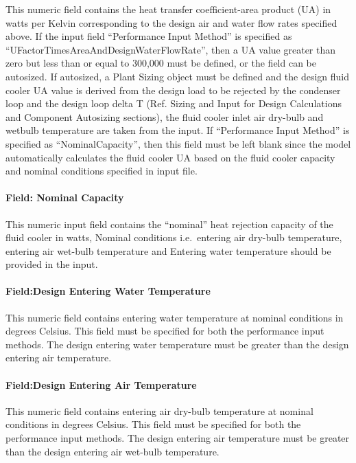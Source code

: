 This numeric field contains the heat transfer coefficient-area product (UA) in watts per Kelvin corresponding to the design air and water flow rates specified above. If the input field ``Performance Input Method'' is specified as ``UFactorTimesAreaAndDesignWaterFlowRate'', then a UA value greater than zero but less than or equal to 300,000 must be defined, or the field can be autosized. If autosized, a Plant Sizing object must be defined and the design fluid cooler UA value is derived from the design load to be rejected by the condenser loop and the design loop delta T (Ref. Sizing and Input for Design Calculations and Component Autosizing sections), the fluid cooler inlet air dry-bulb and wetbulb temperature are taken from the input. If ``Performance Input Method'' is specified as ``NominalCapacity'', then this field must be left blank since the model automatically calculates the fluid cooler UA based on the fluid cooler capacity and nominal conditions specified in input file.

\paragraph{Field: Nominal Capacity}\label{field-nominal-capacity-2}

This numeric input field contains the ``nominal'' heat rejection capacity of the fluid cooler in watts, Nominal conditions i.e.~entering air dry-bulb temperature, entering air wet-bulb temperature and Entering water temperature should be provided in the input.

\paragraph{Field:Design Entering Water Temperature}\label{fielddesign-entering-water-temperature-2}

This numeric field contains entering water temperature at nominal conditions in degrees Celsius. This field must be specified for both the performance input methods. The design entering water temperature must be greater than the design entering air temperature.

\paragraph{Field:Design Entering Air Temperature}\label{fielddesign-entering-air-temperature-2}

This numeric field contains entering air dry-bulb temperature at nominal conditions in degrees Celsius. This field must be specified for both the performance input methods. The design entering air temperature must be greater than the design entering air wet-bulb temperature.


